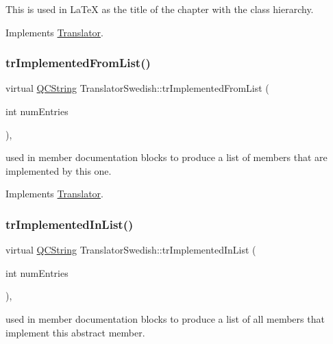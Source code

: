 This is used in La\+TeX as the title of the chapter with the class hierarchy. 

Implements \mbox{\hyperlink{class_translator}{Translator}}.

\mbox{\label{class_translator_swedish_a21510bb58e60d35465a39379543e16c1}} 
\subsubsection{\texorpdfstring{trImplementedFromList()}{trImplementedFromList()}}
{\footnotesize\ttfamily virtual \mbox{\hyperlink{class_q_c_string}{Q\+C\+String}} Translator\+Swedish\+::tr\+Implemented\+From\+List (\begin{DoxyParamCaption}\item[{int}]{num\+Entries }\end{DoxyParamCaption})\hspace{0.3cm}{\ttfamily [inline]}, {\ttfamily [virtual]}}

used in member documentation blocks to produce a list of members that are implemented by this one. 

Implements \mbox{\hyperlink{class_translator}{Translator}}.

\mbox{\label{class_translator_swedish_a2ae2842d082351b56fc10d28a83bb6c2}} 
\subsubsection{\texorpdfstring{trImplementedInList()}{trImplementedInList()}}
{\footnotesize\ttfamily virtual \mbox{\hyperlink{class_q_c_string}{Q\+C\+String}} Translator\+Swedish\+::tr\+Implemented\+In\+List (\begin{DoxyParamCaption}\item[{int}]{num\+Entries }\end{DoxyParamCaption})\hspace{0.3cm}{\ttfamily [inline]}, {\ttfamily [virtual]}}

used in member documentation blocks to produce a list of all members that implement this abstract member. 

